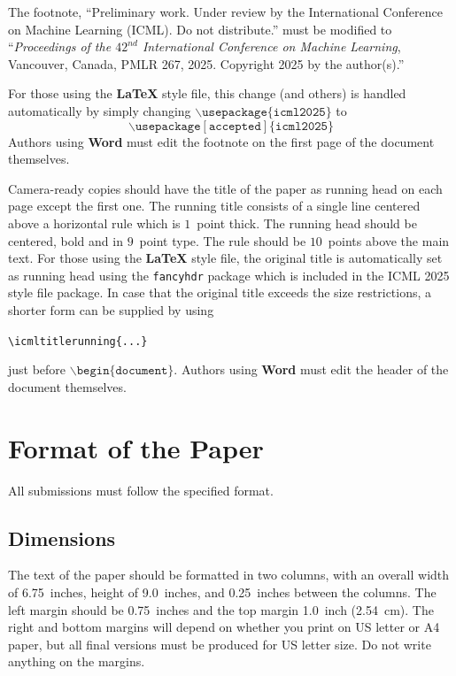\documentclass{article}
\theoremstyle{plain}
\theoremstyle{definition}
\theoremstyle{remark}
\begin{document}
The footnote, ``Preliminary work. Under review by the International
Conference on Machine Learning (ICML). Do not distribute.'' must be
modified to ``\textit{Proceedings of the
$\mathit{42}^{nd}$ International Conference on Machine Learning},
Vancouver, Canada, PMLR 267, 2025.
Copyright 2025 by the author(s).''

For those using the \textbf{\LaTeX} style file, this change (and others) is
handled automatically by simply changing
$\mathtt{\backslash usepackage\{icml2025\}}$ to
$$\mathtt{\backslash usepackage[accepted]\{icml2025\}}$$
Authors using \textbf{Word} must edit the
footnote on the first page of the document themselves.

Camera-ready copies should have the title of the paper as running head
on each page except the first one. The running title consists of a
single line centered above a horizontal rule which is $1$~point thick.
The running head should be centered, bold and in $9$~point type. The
rule should be $10$~points above the main text. For those using the
\textbf{\LaTeX} style file, the original title is automatically set as running
head using the \texttt{fancyhdr} package which is included in the ICML
2025 style file package. In case that the original title exceeds the
size restrictions, a shorter form can be supplied by using

\verb|\icmltitlerunning{...}|

just before $\mathtt{\backslash begin\{document\}}$.
Authors using \textbf{Word} must edit the header of the document themselves.





\section{Format of the Paper}

All submissions must follow the specified format.

\subsection{Dimensions}




The text of the paper should be formatted in two columns, with an
overall width of 6.75~inches, height of 9.0~inches, and 0.25~inches
between the columns. The left margin should be 0.75~inches and the top
margin 1.0~inch (2.54~cm). The right and bottom margins will depend on
whether you print on US letter or A4 paper, but all final versions
must be produced for US letter size.
Do not write anything on the margins.
\end{document}
